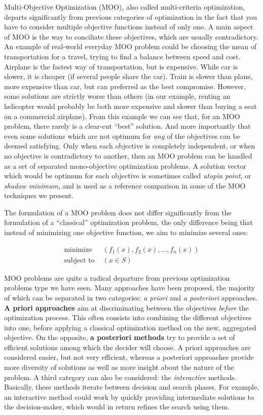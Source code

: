 Multi-Objective Optimization (MOO), also called multi-criteria optimization, departs significantly from previous categories of optimization in the fact that you have to consider multiple objective functions instead of only one. A main aspect of MOO is the way to conciliate these objectives, which are usually contradictory.
An example of real-world everyday MOO problem could be choosing the mean of transportation for a travel, trying to find a balance between speed and cost. Airplane is the fastest way of transportation, but is expensive. While car is slower, it is cheaper (if several people share the car). Train is slower than plane, more expensive than car, but can preferred as the best compromise. However, some solutions are strictly worse than others (in our example, renting an helicopter would probably be both more expensive and slower than buying a seat on a commercial airplane).
From this example we can see that, for an MOO problem, there rarely is a clear-cut \enquote{best} solution. And more importantly that even some solutions which are not optimum for \emph{any} of the objectives can be deemed satisfying. Only when each objective is completely independent, or when no objective is contradictory to another, then an MOO problem can be handled as a set of separated mono-objective optimization problems.
A solution vector which would be optimum for each objective is sometimes called \emph{utopia point}, or \emph{shadow minimum}, and is used as a reference comparison in some of the MOO techniques we present.

The formulation of a MOO problem does not differ significantly from the formulation of a \enquote{classical} optimization problem, the only difference being that instead of minimizing one objective function, we aim to minimize several ones:

\begin{align*}
\text{minimize } & (f_1(x), f_2(x), ..., f_n(x))\\
\text{subject to } & (x \in S)
\end{align*}

MOO problems are quite a radical departure from previous optimization problems type we have seen. Many approaches have been proposed, the majority of which can be separated in two categories: \emph{a priori} and \emph{a posteriori} approaches. \textbf{A priori approaches} aim at discriminating between the objectives \emph{before} the optimization process. This often consists into combining the different objectives into one, before applying a classical optimization method on the new, aggregated objective.
On the opposite, \textbf{a posteriori methods} try to provide a set of efficient solutions among which the decider will choose.
A priori approaches are considered easier, but not very efficient, whereas a posteriori approaches provide more diversity of solutions as well as more insight about the nature of the problem.
A third category can also be considered: the \emph{interactive} methods. Basically, these methods iterate between decision and search phases. For example, an interactive  method could work by quickly providing intermediate solutions to the decision-maker, which would in return refines the search using them.

